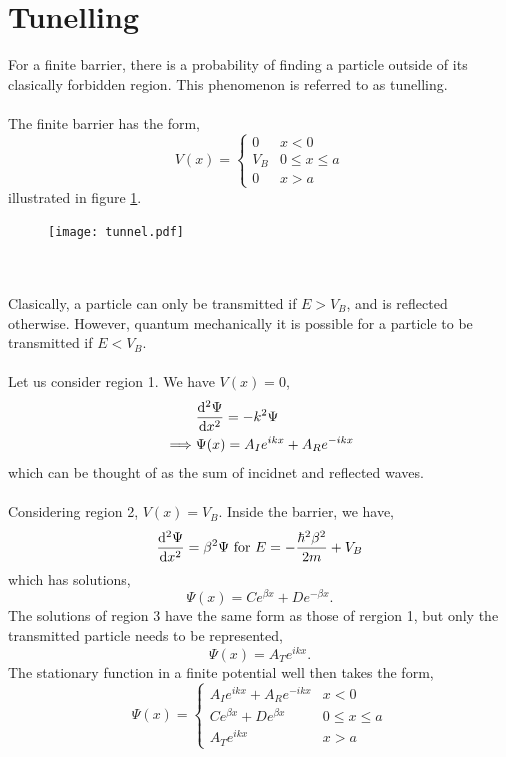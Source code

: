 \documentclass{book}
\begin{document}
\section{Tunelling}
For a finite barrier, there is a probability of finding a particle outside of its clasically forbidden region. This phenomenon is referred to as tunelling.
\\\\
The finite barrier has the form,
\begin{equation}
	V(x) = \begin{cases}
		0 & x < 0 \\
		V_B & 0 \leq x \leq a \\
		0 & x > a
	\end{cases}
\end{equation}
illustrated in figure \ref{tunnel}.
\begin{figure}
	\centering
	\texttt{[image: tunnel.pdf]}
	\caption{}
	\label{tunnel}
\end{figure}
\\\\
Clasically, a particle can only be transmitted if $E > V_B$, and is reflected otherwise. However, quantum mechanically it is possible for a particle to be transmitted if $E < V_B$.
\\\\
Let us consider region 1. We have $V(x) = 0$,
\begin{equation}
	\begin{split}
		& \dv[2]{\Psi}{x} = -k^2 \Psi \\
		\implies & \Psi(x) = A_Ie^{ikx} + A_R e^{-ikx}
	\end{split}
\end{equation}
which can be thought of as the sum of incidnet and reflected waves.
\\\\
Considering region 2, $V(x) = V_B$. Inside the barrier, we have,
\begin{equation}
	\dv[2]{\Psi}{x} = \beta^2 \Psi \text{ for } E = -\frac{\hbar^2\beta^2}{2m} + V_B
\end{equation}
which has solutions,
\begin{equation}
	\Psi(x) = Ce^{\beta x} + De^{-\beta x}.
\end{equation}
The solutions of region 3 have the same form as those of rergion 1, but only the transmitted particle needs to be represented,
\begin{equation}
	\Psi (x) = A_Te^{ikx}.
\end{equation}
The stationary function in a finite potential well then takes the form,
\begin{equation}
	\Psi(x) = \begin{cases}
		A_Ie^{ikx} + A_Re^{-ikx} & x < 0 \\
		Ce^{\beta x} + De^{\beta x} & 0 \leq x \leq a \\
		A_T e^{ikx} & x > a
	\end{cases}
\end{equation}
\end{document}
